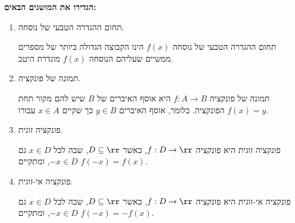 \textbf{הגדירו את המושגים הבאים:}
\begin{enumerate}
\item
תחום ההגדרה הטבעי של נוסחה.
\begin{solbox}
תחום ההגדרה הטבעי של נוסחה
$f(x)$
הינו הקבוצה הגדולה ביותר של מספרים ממשיים שעליהם הנוסחה
$f(x)$
מוגדרת היטב.
\end{solbox}
\item
תמונה של פונקציה.
\begin{solbox}
תמונה של פונקציה
$f: A \rightarrow B$
היא אוסף האיברים של $B$ שיש להם מקור תחת הפונקציה. כלומר, אוסף האיברים
$y \in B$
כך שקיים
$x \in A$
עבורו
$f(x) =y$.
\end{solbox}
\item
פונקציה זוגית.
\begin{solbox}
פונקציה זוגית היא פונקציה
$f :D \rightarrow \rr$,
כאשר
$D \subseteq \rr$,
שבה לכל
$x \in D$
גם
$-x \in D$,
ומתקיים
$f(-x) = f(x)$.
\end{solbox}
\item
פונקציה אי-זוגית.
\begin{solbox}
פונקציה אי-זוגית  היא פונקציה
$f :D \rightarrow \rr$,
כאשר
$D \subseteq \rr$,
שבה לכל
$x \in D$
גם
$-x \in D$,
ומתקיים
$f(-x) =- f(x)$.
\end{solbox}
\eMs
\end{enumerate}

